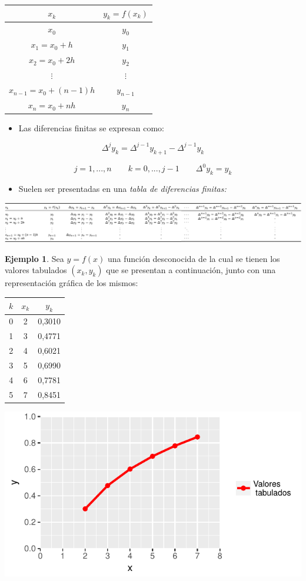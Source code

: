 \documentclass[openany]{book}
\providecommand{\tightlist}{%
  \setlength{\itemsep}{0pt}\setlength{\parskip}{0pt}}
\begin{document}
\begin{longtable}[]{@{}cc@{}}
\toprule
\(x_k\) & \(y_k = f(x_k)\)\tabularnewline
\midrule
\endhead
\(x_0\) & \(y_0\)\tabularnewline
\(x_1 = x_0 + h\) & \(y_1\)\tabularnewline
\(x_2 = x_0 + 2 h\) & \(y_2\)\tabularnewline
\(\vdots\) & \(\vdots\)\tabularnewline
\(x_{n-1} = x_0 + (n-1) h\) & \(y_{n-1}\)\tabularnewline
\(x_{n} = x_0 + n h\) & \(y_n\)\tabularnewline
\bottomrule
\end{longtable}

\begin{itemize}
\tightlist
\item
  Las diferencias finitas se expresan como:
\end{itemize}

\[
\Delta^{j} y_k = \Delta^{j-1} y_{k+1} - \Delta^{j-1} y_k 
\]

\[
j = 1, ..., n \qquad k = 0, ..., j-1 \qquad \Delta^{0} y_k = y_k
\]

\begin{itemize}
\tightlist
\item
  Suelen ser presentadas en una \emph{tabla de diferencias finitas:}
\end{itemize}

\begin{center}\includegraphics[width=1\linewidth]{Plots/U4/tabladif} \end{center}

\textbf{Ejemplo 1}. Sea \(y=f(x)\) una función desconocida de la cual se tienen los valores tabulados \((x_k, y_k)\) que se presentan a continuación, junto con una representación gráfica de los mismos:

\begin{longtable}[]{@{}ccc@{}}
\toprule
\(k\) & \(x_k\) & \(y_k\)\tabularnewline
\midrule
\endhead
0 & 2 & 0,3010\tabularnewline
1 & 3 & 0,4771\tabularnewline
2 & 4 & 0,6021\tabularnewline
3 & 5 & 0,6990\tabularnewline
4 & 6 & 0,7781\tabularnewline
5 & 7 & 0,8451\tabularnewline
\bottomrule
\end{longtable}

\begin{center}\includegraphics[width=1\linewidth]{Plots/U4/Unidad4_g1} \end{center}
\end{document}
